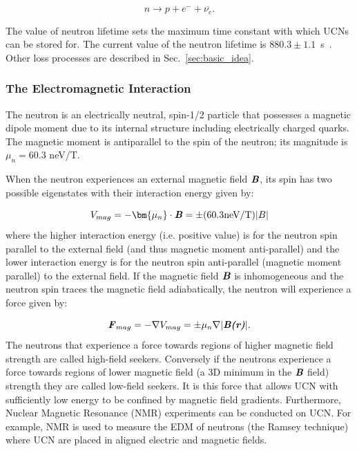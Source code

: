 \begin{equation}
n \rightarrow p + e^- + \overline{\nu_e}.
\end{equation}

The value of neutron lifetime sets the maximum time constant with
which UCNs can be stored for.  The current value of the neutron
lifetime is $880.3 \pm 1.1$~s~\cite{PDG2016}. Other loss processes
are described in Sec.~\ref{sec:basic_idea}.

\subsubsection{The Electromagnetic Interaction}

The neutron is an electrically neutral, spin-1/2 particle that
possesses a magnetic dipole moment due to its internal structure
including electrically charged quarks. The magnetic moment is
antiparallel to the spin of the neutron; its magnitude is $\mu_n=60.3$
neV/T.


When the neutron experiences an external magnetic field
$\textbf{\textit{B}}$, its spin has two possible eigenstates with
their interaction energy given by:

\begin{equation}
\label{eqn:magn}
V_{mag}= - \bm{\mu_n} \cdot \textbf{\textit{B}} = \pm (60.3\textrm{neV/T}) \vert B \vert
\end{equation}
where the higher interaction energy (i.e. positive value) is for the
neutron spin parallel to the external field (and thus magnetic moment
anti-parallel) and the lower interaction energy is for the neutron
spin anti-parallel (magnetic moment parallel) to the external field.
If the magnetic field $\textbf{\textit{B}}$ is inhomogeneous and the
neutron spin traces the magnetic field adiabatically, the neutron will
experience a force given by:

\begin{equation}
\label{eqn:emforce}
\textbf{\textit{F}}_{mag}= - \mathbf{\mathit{\nabla}} V_{mag}=\pm
\mu_n \mathbf{\mathit{\nabla}} \vert \textbf{\textit{B(r)}} \vert.
\end{equation}
The neutrons that experience a force towards regions of higher
magnetic field strength are called high-field seekers. Conversely if
the neutrons experience a force towards regions of lower magnetic
field (a 3D minimum in the $\textbf{\textit{B}}$ field) strength they
are called low-field seekers. It is this force that allows UCN with
sufficiently low energy to be confined by magnetic field gradients.
Furthermore, Nuclear Magnetic Resonance (NMR) experiments can be
conducted on UCN. For example, NMR is used to measure the EDM of
neutrons (the Ramsey technique) where UCN are placed in aligned
electric and magnetic fields.

